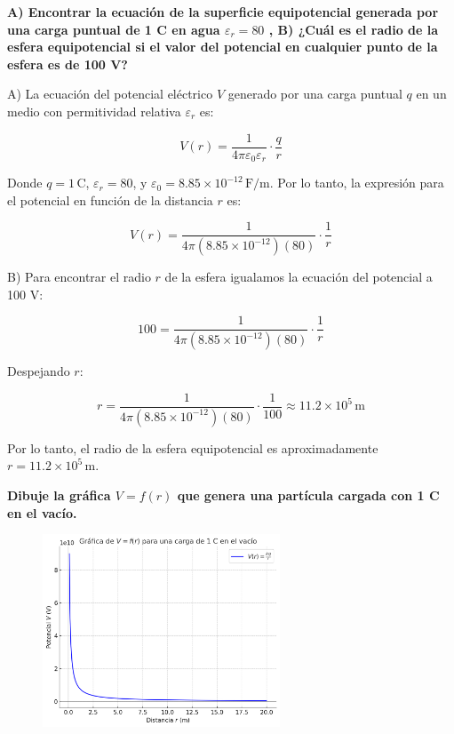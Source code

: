 \documentclass[answers]{exam} %
\begin{document}
\begin{questions}
\begin{center}
	\end{center}

	\vspace{0.5cm}
	\question \large\textbf{A) Encontrar la ecuación de la superficie equipotencial generada por una carga puntual de 1 C en agua $\varepsilon_r = 80$ , B) ¿Cuál es el radio de la esfera equipotencial si el valor del potencial en cualquier punto de la esfera es de 100 V?}

	A) La ecuación del potencial eléctrico $V$ generado por una carga puntual $q$ en un medio con permitividad relativa $\varepsilon_r$ es:

	\[
		V(r) = \frac{1}{4\pi \varepsilon_0 \varepsilon_r} \cdot \frac{q}{r}
	\]

	Donde $q = 1 \, \text{C}$, $\varepsilon_r = 80$, y $\varepsilon_0 = 8.85 \times 10^{-12} \, \text{F/m}$. Por lo tanto, la expresión para el potencial en función de la distancia $r$ es:

	\[
		V(r) = \frac{1}{4\pi (8.85 \times 10^{-12})(80)} \cdot \frac{1}{r}
	\]

	B) Para encontrar el radio $r$ de la esfera igualamos la ecuación del potencial a 100 V:

	\[
		100 = \frac{1}{4\pi (8.85 \times 10^{-12})(80)} \cdot \frac{1}{r}
	\]

	Despejando $r$:

	\[
		r = \frac{1}{4\pi (8.85 \times 10^{-12})(80)} \cdot \frac{1}{100} \approx 11.2 \times 10^5 \, \text{m}
	\]

	Por lo tanto, el radio de la esfera equipotencial es aproximadamente $r = 11.2 \times 10^5 \, \text{m}$.

	\newpage

	\vspace{0.5cm}
	\question \large\textbf{Dibuje la gráfica $V = f(r)$ que genera una partícula cargada con 1 C en el vacío.}

	\begin{figure}[h!]
		\centering
		\includegraphics[width=0.63\textwidth]{./public/g1.png}
	\end{figure}


\end{questions}
\end{document}
